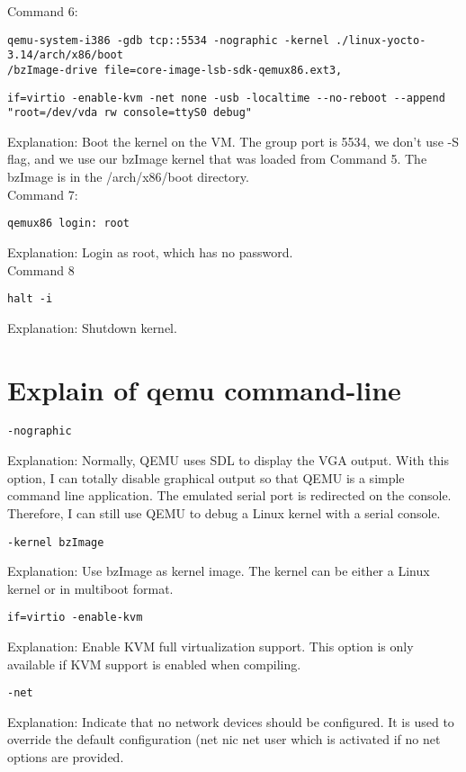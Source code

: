 \documentclass[10pt,draftclsnofoot,peerreview,letterpaper,onecolumn,]{IEEEtran}
\begin{document}
Command 6:
\begin{verbatim}
qemu-system-i386 -gdb tcp::5534 -nographic -kernel ./linux-yocto-3.14/arch/x86/boot
/bzImage-drive file=core-image-lsb-sdk-qemux86.ext3,
\end{verbatim}
\begin{verbatim}
if=virtio -enable-kvm -net none -usb -localtime --no-reboot --append
"root=/dev/vda rw console=ttyS0 debug"
\end{verbatim}
Explanation: Boot the kernel on the VM. The group port is 5534, we don't use -S flag, and we use our bzImage kernel that was loaded from Command 5.
The bzImage is in the /arch/x86/boot directory.\\

Command 7:
\begin{verbatim}
qemux86 login: root
\end{verbatim}
Explanation: Login as root, which has no password.\\

Command 8
\begin{verbatim}
halt -i
\end{verbatim}
Explanation: Shutdown kernel.\\


\newpage
\section{Explain of qemu command-line}
\begin{verbatim}
-nographic
\end{verbatim}
Explanation: Normally, QEMU uses SDL to display the VGA output. With this option, I can totally disable graphical output so that QEMU is a simple command line application. The emulated serial port is redirected on the console. Therefore, I can still use QEMU to debug a Linux kernel with a serial console.

\begin{verbatim}
-kernel bzImage
\end{verbatim}
Explanation: Use bzImage as kernel image. The kernel can be either a Linux kernel or in multiboot format.

\begin{verbatim}
if=virtio -enable-kvm
\end{verbatim}
Explanation: Enable KVM full virtualization support. This option is only available if KVM support is enabled when compiling.

\begin{verbatim}
-net 
\end{verbatim}
Explanation: Indicate that no network devices should be configured. It is used to override the default configuration (\-net nic \-net user which is activated if no \-net options are provided.
\end{document}
